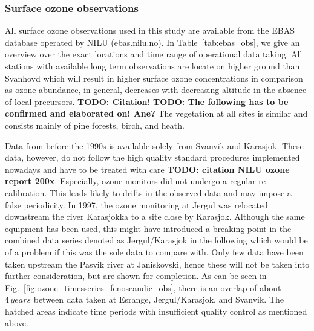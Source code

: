 \documentclass[bg, manuscript]{copernicus}
\begin{document}
\subsubsection{Surface ozone observations}
\label{subsubsec:ebas}
All surface ozone observations used in this study are available from the EBAS database operated by NILU (\href{http://ebas.nilu.no/}{ebas.nilu.no}). In Table~\ref{tab:ebas_obs}, we give an overview over the exact locations and time range of operational data taking. All stations with available long term observations are locate on higher ground than Svanhovd which will result in higher surface ozone concentrations in comparison as ozone abundance, in general, decreases with decreasing altitude in the absence of local precursors. {\bf TODO: Citation!} {\bf TODO: The following has to be confirmed and elaborated on! Ane?} The vegetation at all sites is similar and consists mainly of pine forests, birch, and heath.

Data from before the 1990s is available solely from Svanvik and Karasjok. These data, however, do not follow the high quality standard procedures implemented nowadays and have to be treated with care {\bf TODO: citation NILU ozone report 200x}. Especially, ozone monitors did not undergo a regular re-calibration. This leads likely to drifts in the observed data and may impose a false periodicity. In 1997, the ozone monitoring at Jergul was relocated downstream the river Karasjokka to a site close by Karasjok. Although the same equipment has been used, this might have introduced a breaking point in the combined data series denoted as Jergul/Karasjok in the following which would be of a problem if this was the sole data to compare with. Only few data have been taken upstream the Pasvik river at Janiskovski, hence these will not be taken into further consideration, but are shown for completion. As can be seen in Fig.~\ref{fig:ozone_timesseries_fenoscandic_obs}, there is an overlap of about $4\,\unit{years}$ between data taken at Esrange, Jergul/Karasjok, and Svanvik. The hatched areas indicate time periods with insufficient quality control as mentioned above.
\end{document}
